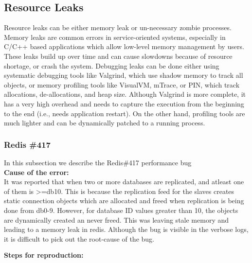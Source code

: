 \subsection{Resource Leaks}
Resource leaks can be either memory leak or un-necessary zombie processes.
Memory leaks are common errors in service-oriented systems, especially in C/C++ based applications which allow low-level memory management by users.
These leaks build up over time and can cause slowdowns because of resource shortage, or crash the system.
Debugging leaks can be done either using systematic debugging tools like Valgrind, which use shadow memory to track all objects, or memory profiling tools like VisualVM, mTrace, or PIN, which track allocations, de-allocations, and heap size.
Although Valgrind is more complete, it has a very high overhead and needs to capture the execution from the beginning to the end (i.e., needs application restart).
On the other hand, profiling tools are much lighter and can be dynamically patched to a running process.



\subsubsection{Redis \#417}

In this subsection we describe the Redis\#417 performance bug \\

\noindent \textbf{Cause of the error:} \\

It was reported that when two or more databases are replicated, and atleast one of them is >=db10. This is because the replication feed for the slaves creates static connection objects which are allocated and freed when replication is being done from db0-9. However, for database ID values greater than 10, the objects are dynamically created an never freed.
This was leaving stale memory and leading to a memory leak in redis.
Although the bug is visible in the verbose logs, it is difficult to pick out the root-cause of the bug.

\noindent \textbf{Steps for reproduction:} \\

